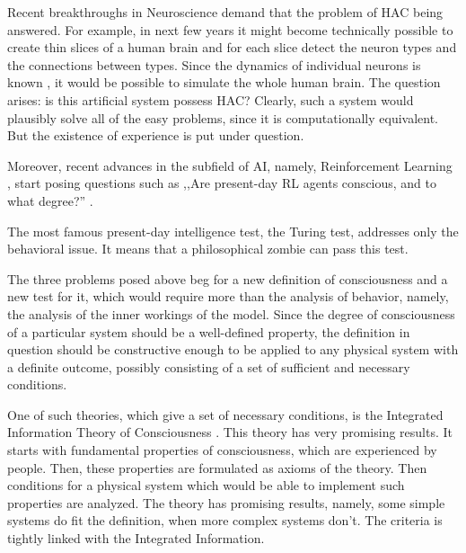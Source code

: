 \documentclass[a4paper, 12pt]{article}
\begin{document}
Recent breakthroughs in Neuroscience demand that the problem of HAC being answered. For example, in next few years it might become technically possible \cite{bluebrain} to create thin slices of a human brain and for each slice detect the neuron types and the connections between types. Since the dynamics of individual neurons is known \cite{hh}, it would be possible to simulate the whole human brain. The question arises: is this artificial system possess HAC? Clearly, such a system would plausibly solve all of the easy problems, since it is computationally equivalent. But the existence of experience is put under question.

Moreover, recent advances in the subfield of AI, namely, Reinforcement Learning \cite{rl}, start posing questions such as ,,Are present-day RL agents conscious, and to what degree?'' \cite{tomasik}.

The most famous present-day intelligence test, the Turing test, addresses only the behavioral issue. It means that a philosophical zombie can pass this test.

The three problems posed above beg for a new definition of consciousness and a new test for it, which would require more than the analysis of behavior, namely, the analysis of the inner workings of the model. Since the degree of consciousness of a particular system should be a well-defined property, the definition in question should be constructive enough to be applied to any physical system with a definite outcome, possibly consisting of a set of sufficient and necessary conditions.

One of such theories, which give a set of necessary conditions, is the Integrated Information Theory of Consciousness \cite{iit}. This theory has very promising results. It starts with fundamental properties of consciousness, which are experienced by people. Then, these properties are formulated as axioms of the theory. Then conditions for a physical system which would be able to implement such properties are analyzed. The theory has promising results, namely, some simple systems do fit the definition, when more complex systems don't. The criteria is tightly linked with the Integrated Information.

\end{document}

